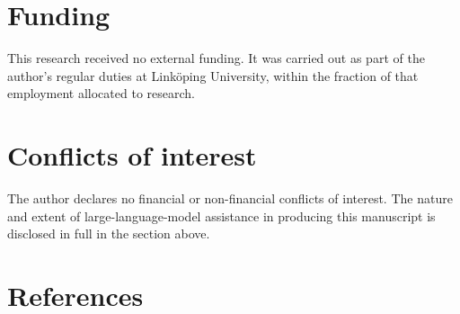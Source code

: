 \documentclass[11pt, a4paper, abstract=yes]{scrartcl}
\theoremstyle{definition}
\theoremstyle{remark}
\theoremstyle{plain}
\begin{document}
\section*{Funding}
\label{sec:orgbaf1416}
This research received no external funding. It was carried out as part of the author's regular duties
at Linköping University, within the fraction of that employment allocated to research.
\section*{Conflicts of interest}
\label{sec:orgb8cc6fe}
The author declares no financial or non-financial conflicts of interest. The nature and extent of
large-language-model assistance in producing this manuscript is disclosed in full in the section
above.
\section*{References}
\label{sec:org29f0676}
\printbibliography[heading=none]
\end{document}
